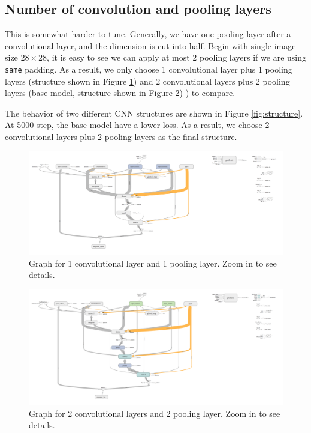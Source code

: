\documentclass[11pt]{article}
\begin{document}
\clearpage
\subsection{Number of convolution and pooling layers}
This is somewhat harder to tune. Generally, we have one pooling layer after a convolutional layer, and the dimension is cut into half. Begin with single image size $28\times 28$, it is easy to see we can apply at most 2 pooling layers if we are using {\tt same} padding. As a result, we only choose 1 convolutional layer plus 1 pooling layers (structure shown in Figure \ref{fig:1-c-1-p}) and 2 convolutional layers plus 2 pooling layers (base model,  structure shown in Figure \ref{fig:2-c-2-p}) ) to compare.

The behavior of two different CNN structures are shown in Figure \ref{fig:structure}. At 5000 step, the base model have a lower loss. As a result, we choose 2 convolutional layers plus 2 pooling layers as the final structure.


\begin{figure}[!htb]
   \centering
   \includegraphics[width=16cm]{images/graph-conv1-pool1.png} %
   \caption{Graph for 1 convolutional layer and 1 pooling layer. Zoom in to see details.}
   \label{fig:1-c-1-p}
\end{figure}


\begin{figure}[!htb]
   \centering
   \includegraphics[width=16cm]{images/graph-conv2-pool2.png} %
   \caption{Graph for 2 convolutional layers and 2 pooling layer. Zoom in to see details.}
   \label{fig:2-c-2-p}
\end{figure}
\end{document}
